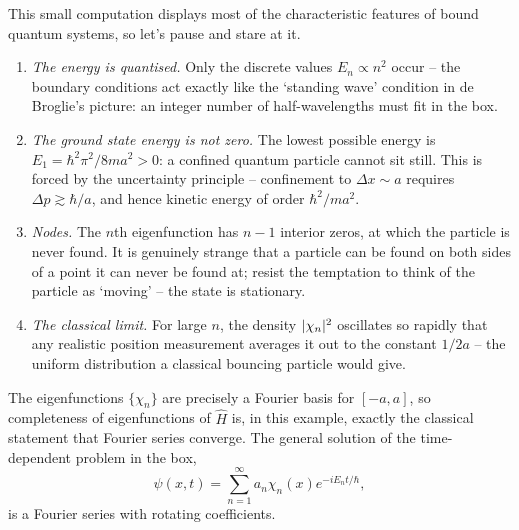 \documentclass[a4paper]{scrartcl}
\begin{document}
This small computation displays most of the characteristic features of bound quantum systems, so let's pause and stare at it.

\begin{enumerate}[label=(\roman*)]
    \item \emph{The energy is quantised.} Only the discrete values $E_n \propto n^2$ occur -- the boundary conditions act exactly like the `standing wave' condition in de Broglie's picture: an integer number of half-wavelengths must fit in the box.
    \item \emph{The ground state energy is not zero.} The lowest possible energy is $E_1 = \hbar^2\pi^2/8ma^2 > 0$: a confined quantum particle cannot sit still. This is forced by the uncertainty principle -- confinement to $\Delta x \sim a$ requires $\Delta p \gtrsim \hbar/a$, and hence kinetic energy of order $\hbar^2 / m a^2$.
    \item \emph{Nodes.} The $n$th eigenfunction has $n - 1$ interior zeros, at which the particle is never found. It is genuinely strange that a particle can be found on both sides of a point it can never be found at; resist the temptation to think of the particle as `moving' -- the state is stationary.
    \item \emph{The classical limit.} For large $n$, the density $\lvert\chi_n\rvert^2$ oscillates so rapidly that any realistic position measurement averages it out to the constant $1/2a$ -- the uniform distribution a classical bouncing particle would give.
\end{enumerate}

\begin{remark}
    The eigenfunctions $\{\chi_n\}$ are precisely a Fourier basis for $[-a, a]$, so completeness of eigenfunctions of $\hat{H}$ is, in this example, exactly the classical statement that Fourier series converge. The general solution of the time-dependent problem in the box,
    $$
    \psi(x,t) = \sum_{n=1}^\infty a_n \chi_n(x) e^{-iE_n t/\hbar},
    $$
    is a Fourier series with rotating coefficients.
\end{remark}
\end{document}
